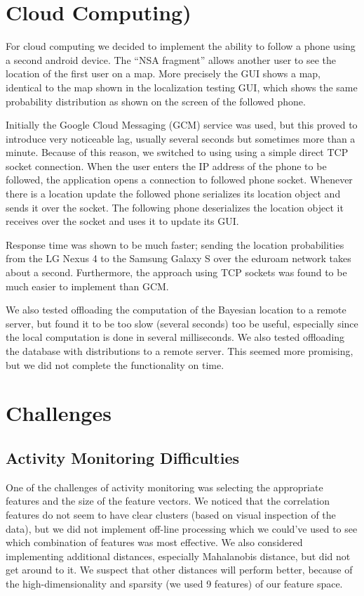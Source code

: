 \documentclass[a4paper,10pt,twoside]{IEEEtran}
\begin{document}
\section{Cloud Computing)}
\label{sec:cloud-computing}

For cloud computing we decided to implement the ability to follow a phone using a second android device.
The ``NSA fragment'' allows another user to see the location of the first user on a map. More precisely the GUI shows a map, identical to the map shown in the localization testing GUI, which shows the same probability distribution as shown on the screen of the followed phone.

Initially the Google Cloud Messaging (GCM) service was used, but this proved to introduce very noticeable lag, usually several seconds but sometimes more than a minute.
Because of this reason, we switched to using using a simple direct TCP socket connection.
When the user enters the IP address of the phone to be followed, the application opens a connection to followed phone socket.
Whenever there is a location update the followed phone serializes its location object and sends it over the socket.
The following phone deserializes the location object it receives over the socket and uses it to update its GUI.

Response time was shown to be much faster; sending the location probabilities from the LG Nexus 4 to the Samsung Galaxy S over the eduroam network takes about a second. Furthermore, the approach using TCP sockets was found to be much easier to implement than GCM.

We also tested offloading the computation of the Bayesian location to a remote server, but found it to be too slow (several seconds) too be useful, especially since the local computation is done in several milliseconds.
We also tested offloading the database with distributions to a remote server.
This seemed more promising, but we did not complete the functionality on time.

\section{Challenges}
\label{sec:innovation}
\subsection{Activity Monitoring Difficulties}
One of the challenges of activity monitoring was selecting the appropriate features and the size of the feature vectors.
We noticed that the correlation features do not seem to have clear clusters (based on visual inspection of the data), but we did not implement off-line processing which we could've used to see which combination of features was most effective.
We also considered implementing additional distances, especially Mahalanobis distance, but did not get around to it. 
We suspect that other distances will perform better, because of the high-dimensionality and sparsity (we used 9 features) of our feature space.
\end{document}
